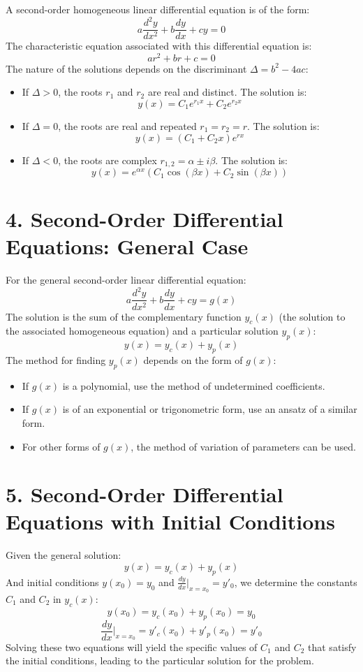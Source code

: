 \documentclass[]{article}
\begin{document}
	A second-order homogeneous linear differential equation is of the form:
	\[
	a\frac{d^2y}{dx^2} + b\frac{dy}{dx} + cy = 0
	\]
	The characteristic equation associated with this differential equation is:
	\[
	ar^2 + br + c = 0
	\]
	The nature of the solutions depends on the discriminant $\Delta = b^2 - 4ac$:
	\begin{itemize}
		\item If $\Delta > 0$, the roots $r_1$ and $r_2$ are real and distinct. The solution is:
		\[
		y(x) = C_1e^{r_1x} + C_2e^{r_2x}
		\]
		\item If $\Delta = 0$, the roots are real and repeated $r_1 = r_2 = r$. The solution is:
		\[
		y(x) = (C_1 + C_2x)e^{rx}
		\]
		\item If $\Delta < 0$, the roots are complex $r_{1,2} = \alpha \pm i\beta$. The solution is:
		\[
		y(x) = e^{\alpha x}(C_1\cos(\beta x) + C_2\sin(\beta x))
		\]
	\end{itemize}
	
	\section*{4. Second-Order Differential Equations: General Case}
	
	For the general second-order linear differential equation:
	\[
	a\frac{d^2y}{dx^2} + b\frac{dy}{dx} + cy = g(x)
	\]
	The solution is the sum of the complementary function $y_c(x)$ (the solution to the associated homogeneous equation) and a particular solution $y_p(x)$:
	\[
	y(x) = y_c(x) + y_p(x)
	\]
	The method for finding $y_p(x)$ depends on the form of $g(x)$:
	\begin{itemize}
		\item If $g(x)$ is a polynomial, use the method of undetermined coefficients.
		\item If $g(x)$ is of an exponential or trigonometric form, use an ansatz of a similar form.
		\item For other forms of $g(x)$, the method of variation of parameters can be used.
	\end{itemize}
	
	\section*{5. Second-Order Differential Equations with Initial Conditions}
	
	Given the general solution:
	\[
	y(x) = y_c(x) + y_p(x)
	\]
	And initial conditions $y(x_0) = y_0$ and $\frac{dy}{dx}\Big|_{x=x_0} = y'_0$, we determine the constants $C_1$ and $C_2$ in $y_c(x)$:
	\[
	y(x_0) = y_c(x_0) + y_p(x_0) = y_0
	\]
	\[
	\frac{dy}{dx}\Big|_{x=x_0} = y'_c(x_0) + y'_p(x_0) = y'_0
	\]
	Solving these two equations will yield the specific values of $C_1$ and $C_2$ that satisfy the initial conditions, leading to the particular solution for the problem.
	
	
\end{document}
